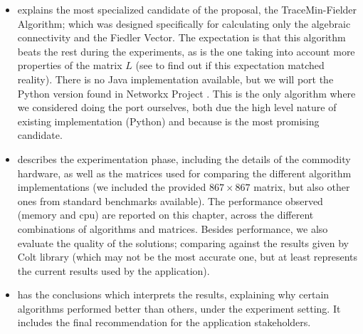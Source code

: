 \begin{itemize}
  \item {} explains the most specialized candidate
    of the proposal, the TraceMin-Fielder Algorithm; which was designed
    specifically for calculating only the algebraic connectivity and
    the Fiedler Vector. The expectation is that this algorithm beats the rest
    during the experiments, as is the one taking into account more
    properties of the matrix $L$ (see  to find out if
    this expectation matched reality). There is no Java implementation
    available, but we will port the Python version found in Networkx
    Project \cite{networkx}. This is the only algorithm where we
    considered doing the port ourselves, both due the high level nature
    of existing implementation (Python) and because is the most
    promising candidate.

  \item {} describes the experimentation phase, including
    the details of the commodity hardware, as well as the matrices
    used for comparing the different algorithm
    implementations (we included the provided $867 \times 867$
    matrix, but also other ones from standard benchmarks
    available). The performance observed (memory and cpu) are reported
    on this chapter, across the different combinations of algorithms
    and matrices. Besides performance, we also evaluate the quality of
    the solutions; comparing against the results given by Colt library
    (which may not be the most accurate one, but at least represents
    the current results used by the application). 

  \item {} has the conclusions which interprets the
    results, explaining why certain algorithms performed better than
    others, under the experiment setting. It includes the final
    recommendation for the application stakeholders.
\end{itemize}
